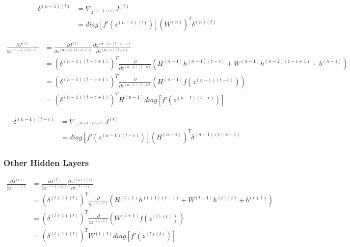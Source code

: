 \documentclass{article}
\begin{document}
	\begin{equation}
	\begin{aligned}
		\delta^{(n-1)(t)} 
		&= \nabla_{z^{(n-1)(t)}} J^{(t)} \\
		&= diag[f'(z^{(n-1)(t)})] (W^{(n)})^T \delta^{(n)(t)}
	\end{aligned}
	\end{equation}
	
	\begin{equation}
	\begin{aligned}
		\frac{\partial J^{(t)}}{\partial z^{(n-1)(t-c)}} 
		&= \frac{\partial J^{(t)}}{\partial z^{(n-1)(t-c+1)}} 
		\frac{\partial z^{(n-1)(t-c+1)}}{\partial z^{(n-1)(t-c)}} \\
		&= (\delta^{(n-1)(t-c+1)})^T \frac{\partial}{\partial z^{(n-1)(t-c)}} (H^{(n-1)} h^{(n-1)(t-c)} + W^{(n-1)} h^{(n-2)(t-c+1)} + b^{(n-1)})\\		
		&= (\delta^{(n-1)(t-c+1)})^T \frac{\partial}{\partial z^{(n-1)(t-c)}} (H^{(n-1)} f(z^{(n-1)(t-c)}))\\
		&= (\delta^{(n-1)(t-c+1)})^T H^{(n-1)} diag[f'(z^{(n-1)(t-c)})]
	\end{aligned}
	\end{equation}
		
	\begin{equation}
	\begin{aligned}
		\delta^{(n-1)(t-c)} 
		&= \nabla_{z^{(n-1)(t-c)}} J^{(t)} \\
		&= diag[f'(z^{(n-1)(t-c)})] (H^{(n-1)})^T \delta^{(n-1)(t-c+1)}
	\end{aligned}
	\end{equation}
	
	\subsubsection{Other Hidden Layers}
	\begin{equation}
	\begin{aligned}
		\frac{\partial J^{(t)}}{\partial z^{(l)(t)}} 
		&= \frac{\partial J^{(t)}}{\partial z^{(l+1)(t)}} 
		\frac{\partial z^{(l+1)(t)}}{\partial z^{(l)(t)}} \\
		&= (\delta^{(l+1)(t)})^T \frac{\partial}{\partial z^{(l)(t)}} (H^{(l+1)} h^{(l+1)(t-1)} + W^{(l+1)} h^{(l)(t)} + b^{(l+1)})\\
		&= (\delta^{(l+1)(t)})^T \frac{\partial}{\partial z^{(l)(t)}} (W^{(l+1)} f(z^{(l)(t)}))\\
		&= (\delta^{(l+1)(t)})^T W^{(l+1)} diag[f'(z^{(l)(t)})]
	\end{aligned}
	\end{equation}
		
\end{document}
